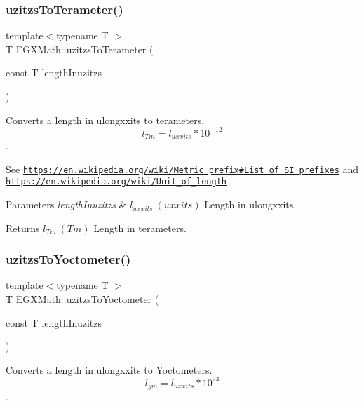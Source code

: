 \subsubsection{\texorpdfstring{uzitzs\+To\+Terameter()}{uzitzsToTerameter()}}
{\footnotesize\ttfamily template$<$typename T $>$ \\
T E\+G\+X\+Math\+::uzitzs\+To\+Terameter (\begin{DoxyParamCaption}\item[{const T}]{length\+Inuzitzs }\end{DoxyParamCaption})}



Converts a length in ulongxxits to terameters. \[ l_{Tm}=l_{uxxits} * 10^{-12} \]. 

See \href{https://en.wikipedia.org/wiki/Metric_prefix#List_of_SI_prefixes}{\tt https\+://en.\+wikipedia.\+org/wiki/\+Metric\+\_\+prefix\#\+List\+\_\+of\+\_\+\+S\+I\+\_\+prefixes} and \href{https://en.wikipedia.org/wiki/Unit_of_length}{\tt https\+://en.\+wikipedia.\+org/wiki/\+Unit\+\_\+of\+\_\+length} 
\begin{DoxyParams}{Parameters}
{\em length\+Inuzitzs} & $ l_{uxxits}\ (uxxits)$ Length in ulongxxits. \\
\hline
\end{DoxyParams}
\begin{DoxyReturn}{Returns}
$ l_{Tm}\ (Tm)$ Length in terameters. 
\end{DoxyReturn}
\mbox{\label{group___e_g_x_math-_conversions-_length_conversions-uzitzs-_s_i_gae0faf7639d852bfde8863b3615aa096a}} 
\subsubsection{\texorpdfstring{uzitzs\+To\+Yoctometer()}{uzitzsToYoctometer()}}
{\footnotesize\ttfamily template$<$typename T $>$ \\
T E\+G\+X\+Math\+::uzitzs\+To\+Yoctometer (\begin{DoxyParamCaption}\item[{const T}]{length\+Inuzitzs }\end{DoxyParamCaption})}



Converts a length in ulongxxits to Yoctometers. \[ l_{ym}=l_{uxxits} * 10^{24} \]. 

